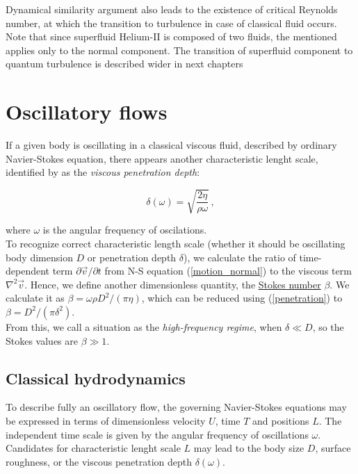 Dynamical similarity argument also leads to the existence of critical Reynolds number, at which the transition to turbulence in case of classical fluid occurs. Note that since superfluid Helium-II is composed of two fluids, the mentioned applies only to the normal component. The transition of superfluid component to quantum turbulence is described wider in next chapters


\section{Oscillatory flows}

If a given body is oscillating in a classical viscous fluid, described by ordinary Navier-Stokes equation, there appears another characteristic lenght scale, identified by \cite{landau} as the \textit{viscous penetration depth}:

\begin{equation}
\delta(\omega) = \sqrt{\frac{2\eta}{\rho\omega}}\,,
\label{penetration}
\end{equation}

where $\omega$ is the angular frequency of oscilations.\\
To recognize correct characteristic length scale (whether it should be oscillating body dimension $D$ or penetration depth $\delta$), we calculate the ratio of time-dependent term $\partial \vec{v} / \partial t$ from N-S equation (\ref{motion_normal}) to the viscous term $\nabla^2 \vec{v}$. Hence, we define another dimensionless quantity, the \underline{Stokes number} $\beta$.
We calculate it \cite{stokes} as $\beta = \omega \rho D^2 / (\pi \eta)$, which can be reduced using (\ref{penetration}) to $\beta = D^2 / (\pi \delta^2)$.\\
From this, we call a situation as the \textit{high-frequency regime}, when $\delta \ll D$, so the Stokes values are $\beta \gg 1$.

\subsection*{Classical hydrodynamics}

To describe fully an oscillatory flow, the governing Navier-Stokes equations may be expressed in terms of dimensionless velocity $U$, time $T$ and positions $L$. The independent time scale is given by the angular frequency of oscillations $\omega$. Candidates for characteristic lenght scale $L$ may lead to the body size $D$, surface roughness, or the viscous penetration depth $\delta(\omega)$.

